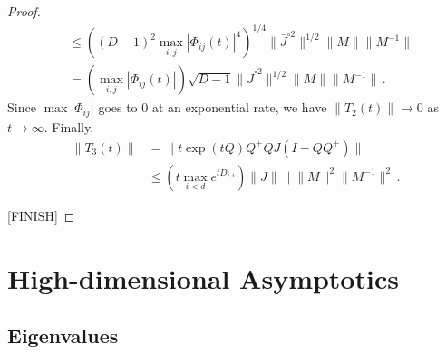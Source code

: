 \documentclass[twoside]{article}
\numberwithin{equation}{section}
\newcommand{\tr}{\mbox{Tr}}
\begin{document}
\begin{proof}
\begin{align*}
	&\leq \left( (D-1)^2 \max_{i,j} |\Phi_{ij}(t)|^4 \right)^{1/4}   \lVert \bar{J}^{\circ 2} \rVert^{1/2}   \lVert M \rVert \lVert M^{-1}  \rVert  \\
	&= \left( \max_{i,j} |\Phi_{ij}(t)| \right)\sqrt{D-1} \lVert \bar{J}^{\circ 2} \rVert^{1/2}   \lVert M \rVert \lVert M^{-1}  \rVert  \, .
\end{align*}
Since $\max |\Phi_{ij}|$ goes to 0 at an exponential rate, we have $\lVert T_2(t)\rVert \rightarrow 0$ as $t\rightarrow \infty$.  Finally,
\begin{align*}
	\lVert T_3(t) \rVert &= \lVert t \exp(tQ) Q^+ Q J( I - QQ^+)  \rVert \\
	&\leq \left(t \max_{i<d} e^{tD_{i,i}} \right) \lVert J \rVert  \rVert \lVert M \rVert^2 \lVert M^{-1} \rVert^2 \, .
\end{align*}
 


[FINISH]
\end{proof}



\section{High-dimensional Asymptotics}



\subsection{Eigenvalues}
\end{document}
